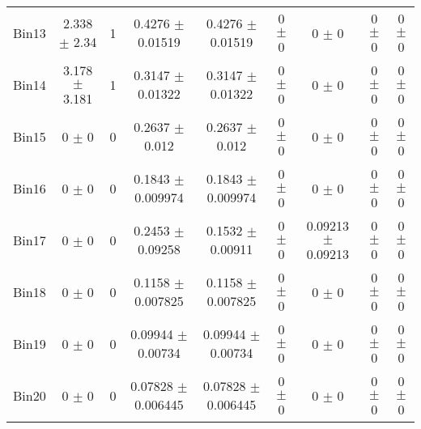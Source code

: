 \begin{tabular}{@{\extracolsep{4pt}}lcccccccc@{}}
     Bin13 & 2.338 $\pm$ 2.34 & 1 & 0.4276 $\pm$ 0.01519 & 0.4276 $\pm$ 0.01519 & 0 $\pm$ 0 & 0 $\pm$ 0 & 0 $\pm$ 0 & 0 $\pm$ 0 \\ 
     Bin14 & 3.178 $\pm$ 3.181 & 1 & 0.3147 $\pm$ 0.01322 & 0.3147 $\pm$ 0.01322 & 0 $\pm$ 0 & 0 $\pm$ 0 & 0 $\pm$ 0 & 0 $\pm$ 0 \\ 
     Bin15 & 0 $\pm$ 0 & 0 & 0.2637 $\pm$ 0.012 & 0.2637 $\pm$ 0.012 & 0 $\pm$ 0 & 0 $\pm$ 0 & 0 $\pm$ 0 & 0 $\pm$ 0 \\ 
     Bin16 & 0 $\pm$ 0 & 0 & 0.1843 $\pm$ 0.009974 & 0.1843 $\pm$ 0.009974 & 0 $\pm$ 0 & 0 $\pm$ 0 & 0 $\pm$ 0 & 0 $\pm$ 0 \\ 
     Bin17 & 0 $\pm$ 0 & 0 & 0.2453 $\pm$ 0.09258 & 0.1532 $\pm$ 0.00911 & 0 $\pm$ 0 & 0.09213 $\pm$ 0.09213 & 0 $\pm$ 0 & 0 $\pm$ 0 \\ 
     Bin18 & 0 $\pm$ 0 & 0 & 0.1158 $\pm$ 0.007825 & 0.1158 $\pm$ 0.007825 & 0 $\pm$ 0 & 0 $\pm$ 0 & 0 $\pm$ 0 & 0 $\pm$ 0 \\ 
     Bin19 & 0 $\pm$ 0 & 0 & 0.09944 $\pm$ 0.00734 & 0.09944 $\pm$ 0.00734 & 0 $\pm$ 0 & 0 $\pm$ 0 & 0 $\pm$ 0 & 0 $\pm$ 0 \\ 
     Bin20 & 0 $\pm$ 0 & 0 & 0.07828 $\pm$ 0.006445 & 0.07828 $\pm$ 0.006445 & 0 $\pm$ 0 & 0 $\pm$ 0 & 0 $\pm$ 0 & 0 $\pm$ 0 \\ 
\hline\hline
  \end{tabular}
